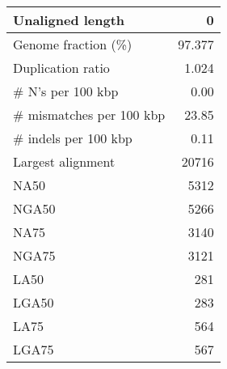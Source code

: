 \documentclass[12pt,a4paper]{article}
\begin{document}
\begin{table}[ht]
\begin{center}
\begin{tabular}{|l*{1}{|r}|}
Unaligned length & 0 \\ \hline
Genome fraction (\%) & 97.377 \\ \hline
Duplication ratio & 1.024 \\ \hline
\# N's per 100 kbp & 0.00 \\ \hline
\# mismatches per 100 kbp & 23.85 \\ \hline
\# indels per 100 kbp & 0.11 \\ \hline
Largest alignment & 20716 \\ \hline
NA50 & 5312 \\ \hline
NGA50 & 5266 \\ \hline
NA75 & 3140 \\ \hline
NGA75 & 3121 \\ \hline
LA50 & 281 \\ \hline
LGA50 & 283 \\ \hline
LA75 & 564 \\ \hline
LGA75 & 567 \\ \hline
\end{tabular}
\end{center}
\end{table}
\end{document}
